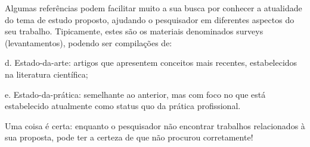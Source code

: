 Algumas referências podem facilitar muito a sua busca por conhecer a atualidade do tema de estudo proposto, ajudando o pesquisador em diferentes aspectos do seu trabalho. Tipicamente, estes são os materiais denominados surveys (levantamentos), podendo ser compilações de:

\begin{alineas}

\item[d.] Estado-da-arte: artigos que apresentem conceitos mais recentes, estabelecidos na literatura científica;

\item[e.] Estado-da-prática: semelhante ao anterior, mas com foco no que está estabelecido atualmente como status quo da prática profissional.

\end{alineas}

Uma coisa é certa: enquanto o pesquisador não encontrar trabalhos relacionados à sua proposta, pode ter a certeza de que não procurou corretamente!